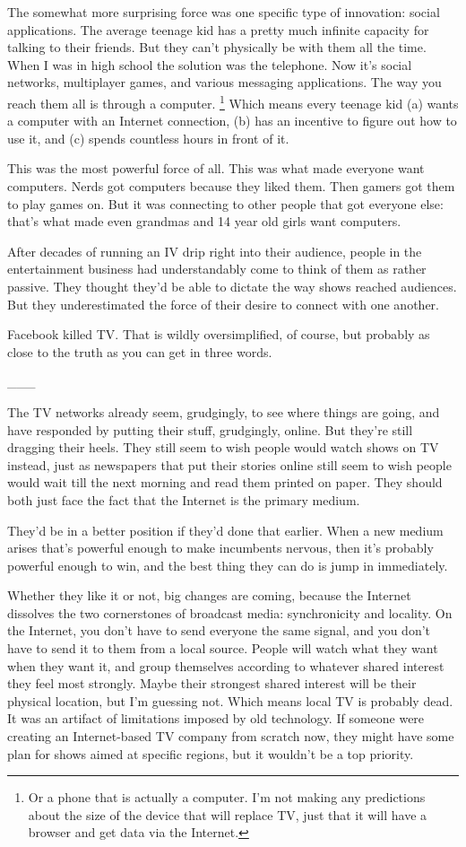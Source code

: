 The somewhat more surprising force was one specific type of innovation:
social applications. The average teenage kid has a pretty much infinite
capacity for talking to their friends. But they can't physically be with
them all the time. When I was in high school the solution was the
telephone. Now it's social networks, multiplayer games, and various
messaging applications. The way you reach them all is through a
computer. \footnote{Or a phone that is actually a computer. I'm not making any
predictions about the size of the device that will replace TV, just that
it will have a browser and get data via the Internet.} Which means every teenage kid (a)
wants a computer with an Internet connection, (b) has an incentive to
figure out how to use it, and (c) spends countless hours in front of it.

This was the most powerful force of all. This was what made everyone
want computers. Nerds got computers because they liked them. Then gamers
got them to play games on. But it was connecting to other people that
got everyone else: that's what made even grandmas and 14 year old girls
want computers.

After decades of running an IV drip right into their audience, people in
the entertainment business had understandably come to think of them as
rather passive. They thought they'd be able to dictate the way shows
reached audiences. But they underestimated the force of their desire to
connect with one another.

Facebook killed TV. That is wildly oversimplified, of course, but
probably as close to the truth as you can get in three words.

\_\_\_

The TV networks already seem, grudgingly, to see where things are going,
and have responded by putting their stuff, grudgingly, online. But
they're still dragging their heels. They still seem to wish people would
watch shows on TV instead, just as newspapers that put their stories
online still seem to wish people would wait till the next morning and
read them printed on paper. They should both just face the fact that the
Internet is the primary medium.

They'd be in a better position if they'd done that earlier. When a new
medium arises that's powerful enough to make incumbents nervous, then
it's probably powerful enough to win, and the best thing they can do is
jump in immediately.

Whether they like it or not, big changes are coming, because the
Internet dissolves the two cornerstones of broadcast media:
synchronicity and locality. On the Internet, you don't have to send
everyone the same signal, and you don't have to send it to them from a
local source. People will watch what they want when they want it, and
group themselves according to whatever shared interest they feel most
strongly. Maybe their strongest shared interest will be their physical
location, but I'm guessing not. Which means local TV is probably dead.
It was an artifact of limitations imposed by old technology. If someone
were creating an Internet-based TV company from scratch now, they might
have some plan for shows aimed at specific regions, but it wouldn't be a
top priority.


